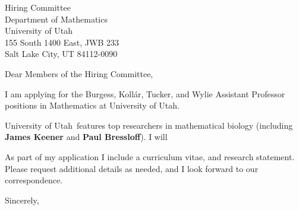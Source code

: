 \documentclass[11pt,a4paper]{letter}
\begin{document}

\def\School{University of Utah}

\begin{letter}
{Hiring Committee\\
Department of Mathematics\\
University of Utah\\
155 South 1400 East, JWB 233\\
Salt Lake City, UT 84112-0090
}


\opening{Dear Members of the Hiring Committee,}

I am applying for the Burgess, Kollár, Tucker, and Wylie Assistant Professor positions in  Mathematics at \School. 



\School~features top researchers in mathematical biology (including \textbf{James Keener} and \textbf{Paul Bressloff}). I will 



As part of my application I include a curriculum vitae, and research statement. Please request additional details as needed, and I look forward to our correspondence.

\closing{Sincerely,}
\end{letter}
\end{document}
